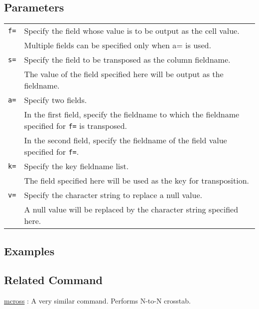 \subsection*{Parameters}
\begin{table}[htbp]

{\small
\begin{tabular}{ll}
\verb|f=|    & Specify the field whose value is to be output as the cell value.\\
             & Multiple fields can be specified only when a= is used.\\
\verb|s=|    & Specify the field to be transposed as the column fieldname.\\
             & The value of the field specified here will be output as the fieldname.\\
\verb|a=|    & Specify two fields.\\
             & In the first field, specify the fieldname to which the fieldname specified for \verb|f=| is transposed.\\
             & In the second field, specify the fieldname of the field value specified for \verb|f=|.\\
\verb|k=|    & Specify the key fieldname list.\\
             & The field specified here will be used as the key for transposition.\\
\verb|v=|    & Specify the character string to replace a null value.\\
             & A null value will be replaced by the character string specified here.\\
\end{tabular} 
}
\end{table} 

\subsection*{Examples}

\subsection*{Related Command}
\hyperref[sect:mcross]{mcross} : A very similar command. Performs N-to-N crosstab.\\

%
